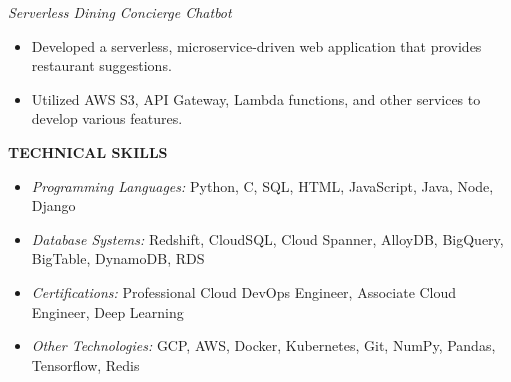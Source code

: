 \documentclass[letterpaper,11pt]{article}
\begin{document}
\noindent
\textit{Serverless Dining Concierge Chatbot}
\begin{itemize}[itemsep=1pt]
    \item Developed a serverless, microservice-driven web application that provides restaurant suggestions.
    \item Utilized AWS S3, API Gateway, Lambda functions, and other services to develop various features.
\end{itemize}

\medskip
\noindent
\textbf{TECHNICAL SKILLS}
\begin{itemize}[itemsep=1pt]
    \item \textit{Programming Languages:} Python, C, SQL, HTML, JavaScript, Java, Node, Django
    \item \textit{Database Systems:} Redshift, CloudSQL, Cloud Spanner, AlloyDB, BigQuery, BigTable, DynamoDB, RDS
    \item \textit{Certifications:} Professional Cloud DevOps Engineer, Associate Cloud Engineer, Deep Learning
    \item \textit{Other Technologies:} GCP, AWS, Docker, Kubernetes, Git, NumPy, Pandas, Tensorflow, Redis
\end{itemize}
\end{document}
